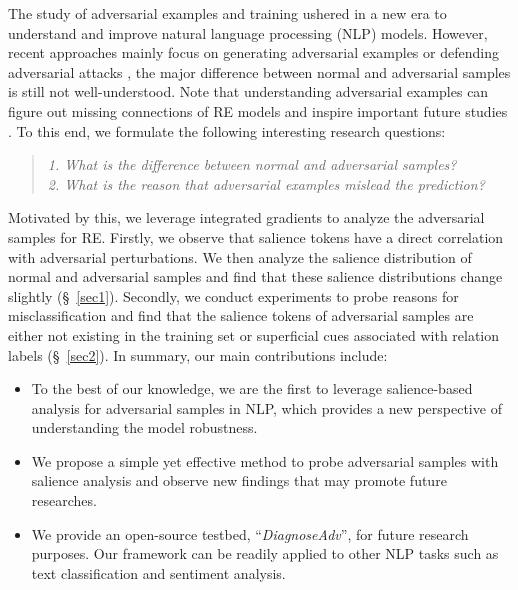 \documentclass[sigconf]{acmart}
\begin{document}
The study of adversarial examples and training ushered in a new era to understand and improve natural language processing (NLP) models.
However, recent approaches mainly focus on generating adversarial examples \cite{DBLP:conf/ndss/LiJDLW19,DBLP:conf/sp/GaoLSQ18,DBLP:conf/ijcai/0002LSBLS18} or defending adversarial attacks \cite{DBLP:conf/wsdm/EntezariADP20,DBLP:conf/cvpr/TheagarajanCBZ19}, the major difference between normal and adversarial samples is still not well-understood. 
Note that understanding adversarial examples can figure out missing connections of RE models and inspire important future studies \cite{DBLP:journals/tacl/BelinkovG19}. 
To this end, we formulate the following interesting research questions:  
\begin{quote}
    \emph{1. What is the difference between normal and adversarial samples?}\\
    \emph{2. What is the reason that adversarial examples mislead the prediction?}
\end{quote}
 
Motivated by this, we leverage integrated gradients \cite{DBLP:conf/icml/SundararajanTY17} to analyze the adversarial samples for RE. 
Firstly, we observe that salience tokens have a direct correlation with adversarial perturbations.
We then analyze the salience distribution of normal and adversarial samples and find that these salience distributions change slightly (\S~\ref{sec1}). 
Secondly, we conduct experiments to probe reasons for misclassification and find that the salience tokens of adversarial samples are either not existing in the training set or superficial cues associated with relation labels (\S~\ref{sec2}). 
In summary, our main contributions include:

\begin{itemize}
    \item To the best of our knowledge, we are the first to leverage salience-based analysis for adversarial samples in NLP, which provides a new perspective of understanding the model robustness. 
    \item We propose a simple yet effective method to probe adversarial samples with salience analysis and observe new findings that may promote future researches. 
    \item We provide an open-source testbed, ``\emph{DiagnoseAdv}'',  for future research purposes. Our framework can be readily applied to other NLP tasks such as text classification and sentiment analysis. 
\end{itemize}
\end{document}
